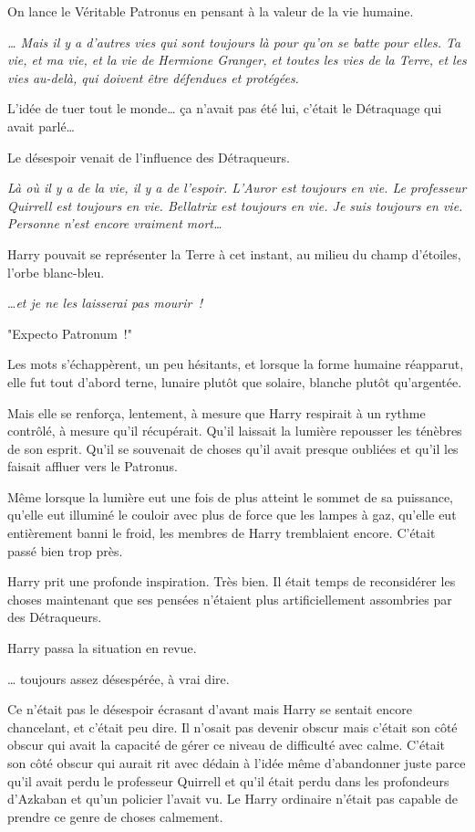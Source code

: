 On lance le Véritable Patronus en pensant à la valeur de la vie humaine.

\emph{… Mais il y a d'autres vies qui sont toujours là pour qu'on se batte pour elles. Ta vie, et ma vie, et la vie de Hermione Granger, et toutes les vies de la Terre, et les vies au-delà, qui doivent être défendues et protégées.}

L'idée de tuer tout le monde… ça n'avait pas été lui, c'était le Détraquage qui avait parlé…

Le désespoir venait de l'influence des Détraqueurs.

\emph{Là où il y a de la vie, il y a de l'espoir. L'Auror est toujours en vie. Le professeur Quirrell est toujours en vie. Bellatrix est toujours en vie. Je suis toujours en vie. Personne n'est encore vraiment mort…}

Harry pouvait se représenter la Terre à cet instant, au milieu du champ d'étoiles, l'orbe blanc-bleu.

…\emph{et je ne les laisserai pas mourir~!}

"Expecto Patronum~!"

Les mots s'échappèrent, un peu hésitants, et lorsque la forme humaine réapparut, elle fut tout d'abord terne, lunaire plutôt que solaire, blanche plutôt qu'argentée.

Mais elle se renforça, lentement, à mesure que Harry respirait à un rythme contrôlé, à mesure qu'il récupérait. Qu'il laissait la lumière repousser les ténèbres de son esprit. Qu'il se souvenait de choses qu'il avait presque oubliées et qu'il les faisait affluer vers le Patronus.

Même lorsque la lumière eut une fois de plus atteint le sommet de sa puissance, qu'elle eut illuminé le couloir avec plus de force que les lampes à gaz, qu'elle eut entièrement banni le froid, les membres de Harry tremblaient encore. C'était passé bien trop près.

Harry prit une profonde inspiration. Très bien. Il était temps de reconsidérer les choses maintenant que ses pensées n'étaient plus artificiellement assombries par des Détraqueurs.

Harry passa la situation en revue.

… toujours assez désespérée, à vrai dire.

Ce n'était pas le désespoir écrasant d'avant mais Harry se sentait encore chancelant, et c'était peu dire. Il n'osait pas devenir obscur mais c'était son côté obscur qui avait la capacité de gérer ce niveau de difficulté avec calme. C'était son côté obscur qui aurait rit avec dédain à l'idée même d'abandonner juste parce qu'il avait perdu le professeur Quirrell et qu'il était perdu dans les profondeurs d'Azkaban et qu'un policier l'avait vu. Le Harry ordinaire n'était pas capable de prendre ce genre de choses calmement.


